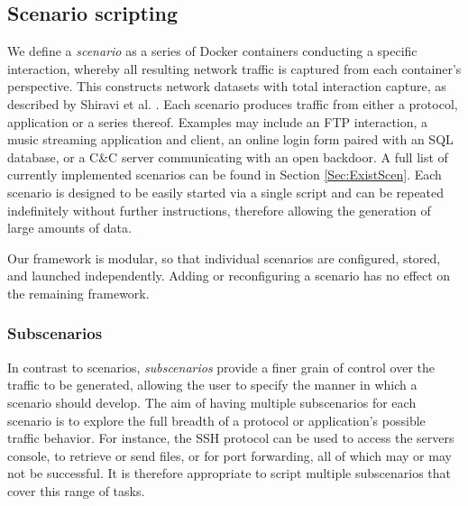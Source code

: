 \documentclass[sigconf]{acmart}
\begin{document}
\subsection{Scenario scripting}\label{Sec:Scenarios}

We define a \emph{scenario} as a series of Docker containers conducting a specific interaction, whereby all resulting network traffic is captured from each container's perspective. This constructs network datasets with total interaction capture, as described by Shiravi et al. \cite{shiravi2012toward}. Each scenario produces traffic from either a protocol, application or a series thereof. %
Examples may include an FTP interaction, a music streaming application and client, an online login form paired with an SQL database, or a C\&C server communicating with an open backdoor. A full list of currently implemented scenarios can be found in Section \ref{Sec:ExistScen}.
Each scenario is designed to be easily started via a single script and can be repeated indefinitely without further instructions, therefore allowing the generation of large amounts of data.

Our framework is modular, so that individual scenarios are configured, stored, and launched independently. Adding or reconfiguring a scenario has no effect on the remaining framework.

\subsubsection*{Subscenarios} \label{Sec:Subscenarios}

In contrast to scenarios, \textit{subscenarios} provide a finer grain of control over the traffic to be generated, allowing the user to specify the manner in which a scenario should develop. The aim of having multiple subscenarios for each scenario is to explore the full breadth of a protocol or application's possible traffic behavior. For instance, the SSH protocol can be used to access the servers console, to retrieve or send files, or for port forwarding, all of which may or may not be successful. It is therefore appropriate to script multiple subscenarios that cover this range of tasks.


\end{document}
